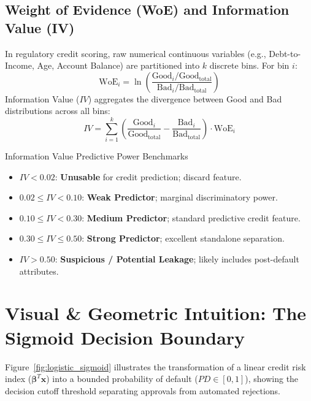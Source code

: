 \subsection{Weight of Evidence (WoE) and Information Value (IV)}
In regulatory credit scoring, raw numerical continuous variables (e.g., Debt-to-Income, Age, Account Balance) are partitioned into $k$ discrete bins. For bin $i$:
\begin{equation}
\text{WoE}_i = \ln\left(\frac{\text{Good}_i / \text{Good}_{\text{total}}}{\text{Bad}_i / \text{Bad}_{\text{total}}}\right)
\label{eq:woe_formula}
\end{equation}
Information Value ($IV$) aggregates the divergence between Good and Bad distributions across all bins:
\begin{equation}
IV = \sum_{i=1}^k \left( \frac{\text{Good}_i}{\text{Good}_{\text{total}}} - \frac{\text{Bad}_i}{\text{Bad}_{\text{total}}} \right) \cdot \text{WoE}_i
\label{eq:iv_formula}
\end{equation}

\begin{theorembox}{Information Value Predictive Power Benchmarks}
\begin{itemize}
    \item $IV < 0.02$: \textbf{Unusable} for credit prediction; discard feature.
    \item $0.02 \le IV < 0.10$: \textbf{Weak Predictor}; marginal discriminatory power.
    \item $0.10 \le IV < 0.30$: \textbf{Medium Predictor}; standard predictive credit feature.
    \item $0.30 \le IV \le 0.50$: \textbf{Strong Predictor}; excellent standalone separation.
    \item $IV > 0.50$: \textbf{Suspicious / Potential Leakage}; likely includes post-default attributes.
\end{itemize}
\end{theorembox}

\section{Visual \& Geometric Intuition: The Sigmoid Decision Boundary}

Figure~\ref{fig:logistic_sigmoid} illustrates the transformation of a linear credit risk index ($\boldsymbol{\beta}^T \mathbf{x}$) into a bounded probability of default ($PD \in [0, 1]$), showing the decision cutoff threshold separating approvals from automated rejections.

